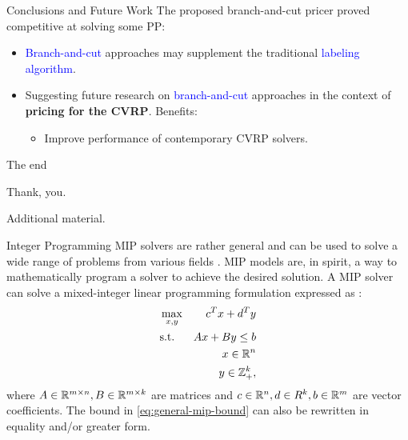 \begin{frame}{Conclusions and Future Work}
	The proposed branch-and-cut pricer proved competitive at solving some PP:
	\begin{itemize}
		\item \textcolor{blue}{Branch-and-cut} approaches may supplement the traditional \textcolor{blue}{labeling algorithm}.
		\item Suggesting future research on \textcolor{blue}{branch-and-cut} approaches in the context of \textbf{pricing for the CVRP}.
		      Benefits:
		      \begin{itemize}
			      \item Improve performance of contemporary CVRP solvers.
		      \end{itemize}
	\end{itemize}
\end{frame}

\begin{frame}{The end}
	\begin{center}
		\begingroup
		\fontsize{18pt}{18pt}\selectfont
		Thank, you.
		\endgroup
	\end{center}
\end{frame}

\appendix

\begin{frame}
\end{frame}

\begin{frame}
	\begin{center}
		\begingroup
		\fontsize{18pt}{18pt}\selectfont
		Additional material.
		\endgroup
	\end{center}
\end{frame}

\begin{frame}{Integer Programming}
	MIP solvers are rather general and can be used to solve a wide range of problems from various fields \parencite{bixby2007progress}.
	MIP models are, in spirit, a way to mathematically program a solver to achieve the desired solution.
	A MIP solver can solve a mixed-integer linear programming formulation
	expressed as \parencite{wolsey1999integer}:
	\begin{align}
		 & \max_{x, y} & c^T x + d^T y                                 \\
		 & \text{s.t.} & A x + B y \le b  \label{eq:general-mip-bound} \\
		 &             & x \in \mathbb R^n                                    \\
		 &             & y \in \mathbb Z_{+}^k,
	\end{align}
	where $A \in \mathbb R^{m \times n}, B \in \mathbb R^{m \times k}$ are matrices and
	$c \in \mathbb R^n, d \in R^k, b \in \mathbb R^m$ are vector coefficients.
	The bound in \cref{eq:general-mip-bound} can also be rewritten in equality and/or greater form.
\end{frame}

